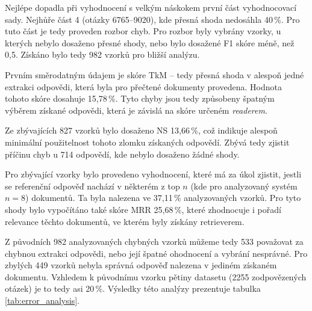 Nejlépe dopadla při vyhodnocení s velkým náskokem první část vyhodnocovací sady. Nejhůře část 4 (otázky 6765--9020), kde přesná shoda nedosáhla 40\,\%. Pro tuto část je tedy proveden rozbor chyb. Pro rozbor byly vybrány vzorky, u kterých nebylo dosaženo přesné shody, nebo bylo dosažené F1 skóre méně, než 0,5. Získáno bylo tedy 982 vzorků pro bližší analýzu.\par
Prvním směrodatným údajem je skóre TkM -- tedy přesná shoda v alespoň jedné extrakci odpovědi, která byla pro přečtené dokumenty provedena. Hodnota tohoto skóre dosahuje 15,78\,\%. Tyto chyby jsou tedy způsobeny špatným výběrem získané odpovědi, která je závislá na skóre určeném \emph{readerem}.\par
Ze zbývajících 827 vzorků bylo dosaženo NS 13,66\,\%, což indikuje alespoň minimální použitelnost tohoto zlomku získaných odpovědí. Zbývá tedy zjistit příčinu chyb u 714 odpovědí, kde nebylo dosaženo žádné shody.\par
Pro zbývající vzorky bylo provedeno vyhodnocení, které má za úkol zjistit, jestli se referenční odpověď nachází v některém z top $n$ (kde pro analyzovaný systém $n=8$) dokumentů. Ta byla nalezena ve 37,11\,\% analyzovaných vzorků. Pro tyto shody bylo vypočítáno také skóre MRR 25,68\,\%, které zhodnocuje i pořadí relevance těchto dokumentů, ve kterém byly získány retrieverem.\par
Z původních 982 analyzovaných chybných vzorků můžeme tedy 533 považovat za chybnou extrakci odpovědi, nebo její špatné ohodnocení a vybrání nesprávné. Pro zbylých 449 vzorků nebyla správná odpověď nalezena v jediném získaném dokumentu. Vzhledem k původnímu vzorku pětiny datasetu (2255 zodpovězených otázek) je to tedy asi 20\,\%. Výsledky této analýzy prezentuje tabulka \ref{tab:error_analysis}.

